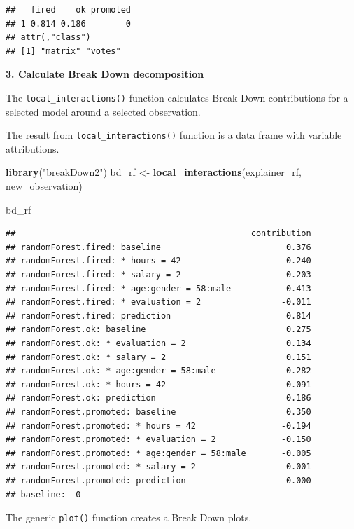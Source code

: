 \documentclass[]{krantz}
\newenvironment{Shaded}{\begin{snugshade}}{\end{snugshade}}
\newcommand{\KeywordTok}[1]{\textcolor[rgb]{0.13,0.29,0.53}{\textbf{#1}}}
\newcommand{\NormalTok}[1]{#1}
\newcommand{\StringTok}[1]{\textcolor[rgb]{0.31,0.60,0.02}{#1}}
\theoremstyle{definition}
\theoremstyle{definition}
\theoremstyle{definition}
\theoremstyle{remark}
\begin{document}
\begin{verbatim}
##   fired    ok promoted
## 1 0.814 0.186        0
## attr(,"class")
## [1] "matrix" "votes"
\end{verbatim}

\textbf{3. Calculate Break Down decomposition}

The \texttt{local\_interactions()} function calculates Break Down
contributions for a selected model around a selected observation.

The result from \texttt{local\_interactions()} function is a data frame
with variable attributions.

\begin{Shaded}
\begin{Highlighting}[]
\KeywordTok{library}\NormalTok{(}\StringTok{"breakDown2"}\NormalTok{)}
\NormalTok{bd_rf <-}\StringTok{ }\KeywordTok{local_interactions}\NormalTok{(explainer_rf,}
\NormalTok{                 new_observation)}

\NormalTok{bd_rf}
\end{Highlighting}
\end{Shaded}

\begin{verbatim}
##                                               contribution
## randomForest.fired: baseline                         0.376
## randomForest.fired: * hours = 42                     0.240
## randomForest.fired: * salary = 2                    -0.203
## randomForest.fired: * age:gender = 58:male           0.413
## randomForest.fired: * evaluation = 2                -0.011
## randomForest.fired: prediction                       0.814
## randomForest.ok: baseline                            0.275
## randomForest.ok: * evaluation = 2                    0.134
## randomForest.ok: * salary = 2                        0.151
## randomForest.ok: * age:gender = 58:male             -0.282
## randomForest.ok: * hours = 42                       -0.091
## randomForest.ok: prediction                          0.186
## randomForest.promoted: baseline                      0.350
## randomForest.promoted: * hours = 42                 -0.194
## randomForest.promoted: * evaluation = 2             -0.150
## randomForest.promoted: * age:gender = 58:male       -0.005
## randomForest.promoted: * salary = 2                 -0.001
## randomForest.promoted: prediction                    0.000
## baseline:  0
\end{verbatim}

The generic \texttt{plot()} function creates a Break Down plots.
\end{document}
